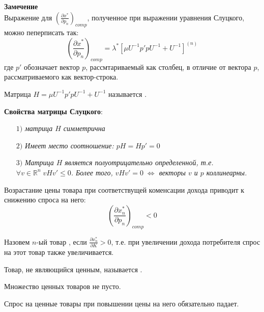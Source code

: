 \textbf{Замечение}\\

Выражение для $\left(\frac{\partial x^{*}}{\partial p_n}\right)_{comp}$, полученное при выражении уравнения Слуцкого, можно пеперписать так:
$$\left(\frac{\partial x^{*}}{\partial p_n}\right)_{comp} = \lambda^{*} \left[ \mu U^{-1} p' p U^{-1} + U^{-1} \right]^{(n)}$$
где $p'$ обозначает вектор $p$, рассмтариваемый как столбец, в отличие от вектора $p$, рассматриваемого как вектор-строка.

\begin{definition}\label{cha:3/def:2}
	Матрица $H = \mu U^{-1} p' p U^{-1} + U^{-1}$ называется .
\end{definition}

\textbf{Свойства матрицы Слуцкого}:
\begin{itemize}
	\item[$1)$]
		\textit{матрица $H$ симметрична}
	\item[$2)$]
		\textit{Имеет место соотношение: $p H = H p' = 0$}
	\item[$3)$]
		\textit{Матрица $H$ является полуотрицательно определенной, т.е. $\forall v \in \mathbb{R}^n \; v H v' \le 0$. Более того, $v H v' = 0 \; \Leftrightarrow$ векторы $v$ и $p$ коллинеарны.}
\end{itemize}

\begin{conseq}[]\label{cha:3/conseq:1}
	Возрастание цены товара при соответствущей коменсации дохода приводит к снижению спроса на него:
	$$\left(\frac{\partial x_n^{*}}{\partial p_n}\right)_{comp} < 0$$
\end{conseq}

\begin{definition}\label{cha:3/def:3}
	Назовем $n$-ый товар , если $\frac{\partial x_n^{*}}{\partial K} > 0$, т.е. при увеличении дохода потребителя спрос на этот товар также увеличивается.

	Товар, не являющийся ценным, называется .
\end{definition}

\begin{conseq}[]\label{cha:3/conseq:2}
	Множество ценных товаров не пусто.
\end{conseq}

\begin{conseq}[]\label{cha:3/conseq:3}
	Спрос на ценные товары при повышении цены на него обязательно падает.
\end{conseq}

